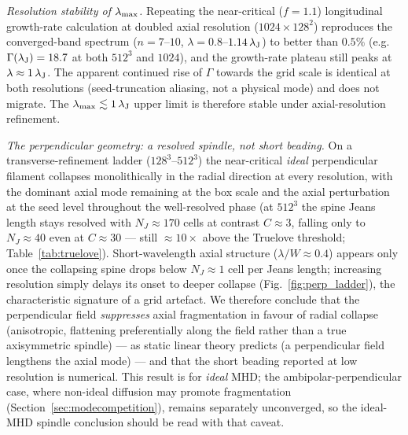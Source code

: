 \documentclass[usenatbib,twoside,twocolumn]{mnras}
\begin{document}
\emph{Resolution stability of $\lambda_{\rm max}$.} Repeating the near-critical ($f=1.1$) longitudinal growth-rate calculation at doubled axial resolution ($1024\times128^2$) reproduces the converged-band spectrum ($n=7$--$10$, $\lambda=0.8$--$1.14\,\lambda_{\rm J}$) to better than $0.5\%$ (e.g.\ $\Gamma(\lambda_{\rm J})=18.7$ at both $512^3$ and $1024$), and the growth-rate plateau still peaks at $\lambda\approx1\,\lambda_{\rm J}$. The apparent continued rise of $\Gamma$ towards the grid scale is identical at both resolutions (seed-truncation aliasing, not a physical mode) and does not migrate. The $\lambda_{\rm max}\lesssim1\,\lambda_{\rm J}$ upper limit is therefore stable under axial-resolution refinement.

\emph{The perpendicular geometry: a resolved spindle, not short beading.} On a transverse-refinement ladder ($128^3$--$512^3$) the near-critical \emph{ideal} perpendicular filament collapses monolithically in the radial direction at every resolution, with the dominant axial mode remaining at the box scale and the axial perturbation at the seed level throughout the well-resolved phase (at $512^3$ the spine Jeans length stays resolved with $N_J\approx170$ cells at contrast $C\approx3$, falling only to $N_J\approx40$ even at $C\approx30$ --- still $\approx10\times$ above the Truelove threshold; Table~\ref{tab:truelove}). Short-wavelength axial structure ($\lambda/W\approx0.4$) appears only once the collapsing spine drops below $N_J\approx1$ cell per Jeans length; increasing resolution simply delays its onset to deeper collapse (Fig.~\ref{fig:perp_ladder}), the characteristic signature of a grid artefact. We therefore conclude that the perpendicular field \emph{suppresses} axial fragmentation in favour of radial collapse (anisotropic, flattening preferentially along the field rather than a true axisymmetric spindle) --- as static linear theory predicts (a perpendicular field lengthens the axial mode) --- and that the short beading reported at low resolution is numerical. This result is for \emph{ideal} MHD; the ambipolar-perpendicular case, where non-ideal diffusion may promote fragmentation (Section~\ref{sec:modecompetition}), remains separately unconverged, so the ideal-MHD spindle conclusion should be read with that caveat.
\end{document}

